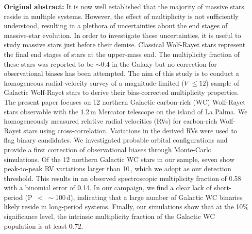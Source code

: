 \newpage
\begin{abs}
\vspace{3mm}
\textbf{Original abstract:}
\newline \newline
It is now well established that the majority of massive stars reside in multiple systems. However, the effect of multiplicity is not sufficiently understood, resulting in a plethora of uncertainties about the end stages of massive-star evolution. In order to investigate these uncertainties, it is useful to study massive stars just before their demise. Classical Wolf-Rayet stars represent the final end stages of stars at the upper-mass end. The multiplicity fraction of these stars was reported to be ${\sim}0.4$ in the Galaxy but no correction for observational biases has been attempted.
\newline \newline%
The aim of this study is to conduct a homogeneous radial-velocity survey of a magnitude-limited ($V$ $\leq 12$) sample of Galactic Wolf-Rayet stars to derive their bias-corrected multiplicity properties. The present paper focuses on 12 northern Galactic carbon-rich (WC) Wolf-Rayet stars observable with the 1.2\,m Mercator telescope on the island of La Palma.
\newline \newline  %
We homogeneously measured relative radial velocities (RVs) for carbon-rich Wolf-Rayet stars using cross-correlation. Variations in the derived RVs were used to flag binary candidates. We investigated probable orbital configurations and provide a first correction of observational biases through Monte-Carlo simulations.
\newline \newline%
Of the 12 northern Galactic WC stars in our sample, seven show peak-to-peak RV variations larger than 10\,\kms{}, which we adopt as our detection threshold. This results in an observed spectroscopic multiplicity fraction of 0.58 with a binomial error of 0.14. In our campaign, we find a clear lack of short-period (P~$<~\sim$100\,d), indicating that a large number of Galactic WC binaries likely reside in long-period systems. Finally, our simulations show that at the 10\% significance level, the intrinsic multiplicity fraction of the Galactic WC population is at least 0.72.

\end{abs}

